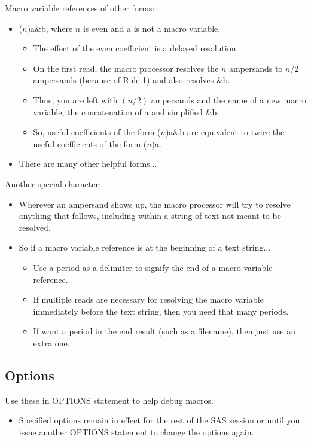 \documentclass[11pt, oneside]{article}
\begin{document}
Macro variable references of other forms:
\begin{itemize}
\item ($n$)a\&b, where $n$ is even and a is not a macro variable.
	\begin{itemize}
	\item The effect of the even coefficient is a delayed resolution.
	\item On the first read, the macro processor resolves the $n$ ampersands to $n/2$ ampersands (because of Rule 1) and also resolves \&b.
	\item Thus, you are left with $(n/2)$ ampersands and the name of a new macro variable, the concatenation of a and simplified \&b.
	\item So, useful coefficients of the form ($n$)a\&b are equivalent to twice the useful coefficients of the form ($n$)a.
	\end{itemize}
\item There are many other helpful forms...
\end{itemize}

Another special character:
\begin{itemize}
\item Wherever an ampersand shows up, the macro processor will try to resolve anything that follows, including within a string of text not meant to be resolved. 
\item So if a macro variable reference is at the beginning of a text string...
	\begin{itemize}
	\item Use a period as a delimiter to signify the end of a macro variable reference.
	\item If multiple reads are necessary for resolving the macro variable immediately before the text string, then you need that many periods.
	\item If want a period in the end result (such as a filename), then just use an extra one. 
	\end{itemize}
\end{itemize}

\subsection{Options}

Use these in OPTIONS statement to help debug macros.
\begin{itemize}
\item Specified options remain in effect for the rest of the SAS session or until you issue another OPTIONS statement to change the options again.
\end{itemize}
\end{document}
